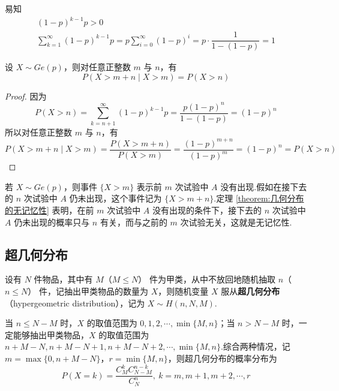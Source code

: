 易知
\begin{gather*}
    (1-p)^{k-1} p > 0 \\
    \sum_{k=1}^\infty (1-p)^{k-1} p = p \sum_{i=0}^\infty (1-p)^i = p \cdot \dfrac{1}{1-(1-p)} = 1    
\end{gather*}

\begin{theorem}
    \indent 设 $X \sim Ge(p)$，则对任意正整数 $m$ 与 $n$，有
    \begin{equation}
        P(X > m+n \mid X>m) = P(X>n)
    \end{equation}
\end{theorem}

\begin{proof}
    因为
    $$
    P(X>n) = \sum_{k=n+1}^{\infty} (1-p)^{k-1} p = \dfrac{p (1-p)^n}{1-(1-p)} = (1-p)^n
    $$
    所以对任意正整数 $m$ 与 $n$，有
    $$
    P(X > m+n \mid X>m) = \dfrac{P(X > m+n)}{P(X>m)} = \dfrac{(1-p)^{m+n}}{(1-p)^m} = (1-p)^n = P(X>n)
    $$

    \vspace{-2em}
\end{proof}

\begin{note}
    \indent 若 $X \sim Ge(p)$，则事件 $\{ X>m \}$ 表示前 $m$ 次试验中 $A$ 没有出现.假如在接下去的 $n$ 次试验中 $A$ 仍未出现，这个事件记为 $\{ X > m+n \}$.定理 \ref{theorem:几何分布的无记忆性} 表明，在前 $m$ 次试验中 $A$ 没有出现的条件下，接下去的 $n$ 次试验中 $A$ 仍未出现的概率只与 $n$ 有关，而与之前的 $m$ 次试验无关，这就是无记忆性.
\end{note}

\subsection{超几何分布}

设有 $N$ 件物品，其中有 $M$（$M \leqslant N$） 件为甲类，从中不放回地随机抽取 $n$（$n \leqslant N$） 件，记抽出甲类物品的数量为 $X$，则随机变量 $X$ 服从\textbf{超几何分布}（hypergeometric distribution），记为 $X \sim H(n,N,M)$.

当 $n \leqslant N-M$ 时，$X$ 的取值范围为 $0,1,2,\cdots,\min\{ M,n \}$；当 $n > N-M$ 时，一定能够抽出甲类物品，$X$ 的取值范围为 $n+M-N, n+M-N+1, n+M-N+2, \cdots, \min\{ M,n \}$.综合两种情况，记 $m = \max\{ 0, n+M-N \}$，$r = \min\{ M,n \}$，则超几何分布的概率分布为
$$
P(X=k) = \dfrac{C_M^k C_{N-M}^{n-k}}{C_N^n},\ k=m, m+1, m+2, \cdots, r
$$


